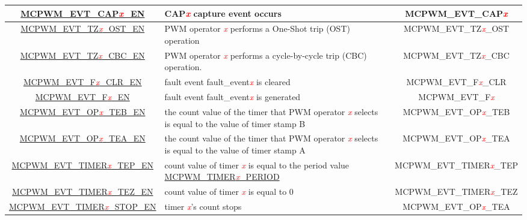 \begin{ThreePartTable}
\begin{longtable}[c]{| c | C{7cm} | c |}
    \hyperref[fielddesc:MCPWMEVTCAP0EN]{MCPWM\_EVT\_CAP\textcolor{red}{\it{x}}\_EN}  
    &  CAP\textcolor{red}{\it{x}} capture event occurs
    &  MCPWM\_EVT\_CAP\textcolor{red}{\it{x}}    \\\hline
    \hyperref[fielddesc:MCPWMEVTTZ0OSTEN]{MCPWM\_EVT\_TZ\textcolor{red}{\it{x}}\_OST\_EN}  
    &  PWM operator \textcolor{red}{\it{x}} performs a One-Shot trip (OST) operation
    &  MCPWM\_EVT\_TZ\textcolor{red}{\it{x}}\_OST    \\\hline
    \hyperref[fielddesc:MCPWMEVTTZ0CBCEN]{MCPWM\_EVT\_TZ\textcolor{red}{\it{x}}\_CBC\_EN}
    & PWM operator \textcolor{red}{\it{x}} performs a cycle-by-cycle trip (CBC) operation.
    & MCPWM\_EVT\_TZ\textcolor{red}{\it{x}}\_CBC    \\\hline
    \hyperref[fielddesc:MCPWMEVTF0CLREN]{MCPWM\_EVT\_F\textcolor{red}{\it{x}}\_CLR\_EN}
    & fault event fault\_event\textcolor{red}{\it{x}} is cleared
    & MCPWM\_EVT\_F\textcolor{red}{\it{x}}\_CLR    \\\hline
    \hyperref[fielddesc:MCPWMEVTF0EN]{MCPWM\_EVT\_F\textcolor{red}{\it{x}}\_EN}
    & fault event fault\_event\textcolor{red}{\it{x}} is generated
    & MCPWM\_EVT\_F\textcolor{red}{\it{x}}    \\\hline
    \hyperref[fielddesc:MCPWMEVTOP0TEBEN]{MCPWM\_EVT\_OP\textcolor{red}{\it{x}}\_TEB\_EN}
    & the count value of the timer that PWM operator \textcolor{red}{\it{x}} selects is equal to the value of timer stamp B
    & MCPWM\_EVT\_OP\textcolor{red}{\it{x}}\_TEB    \\\hline
    \hyperref[fielddesc:MCPWMEVTOP0TEAEN]{MCPWM\_EVT\_OP\textcolor{red}{\it{x}}\_TEA\_EN}
    & the count value of the timer that PWM operator \textcolor{red}{\it{x}} selects is equal to the value of timer stamp A
    & MCPWM\_EVT\_OP\textcolor{red}{\it{x}}\_TEA    \\\hline
    \hyperref[fielddesc:MCPWMEVTTIMER0TEPEN]{MCPWM\_EVT\_TIMER\textcolor{red}{\it{x}}\_TEP\_EN}
    & count value of timer \textcolor{red}{\it{x}} is equal to the period value \hyperref[fielddesc:MCPWMTIMER0PERIOD]{MCPWM\_TIMER\textcolor{red}{\it{x}}\_PERIOD}
    & MCPWM\_EVT\_TIMER\textcolor{red}{\it{x}}\_TEP    \\\hline
    \hyperref[fielddesc:MCPWMEVTTIMER0TEZEN]{MCPWM\_EVT\_TIMER\textcolor{red}{\it{x}}\_TEZ\_EN}
    & count value of timer \textcolor{red}{\it{x}} is equal to 0
    & MCPWM\_EVT\_TIMER\textcolor{red}{\it{x}}\_TEZ    \\\hline
    \hyperref[fielddesc:MCPWMEVTTIMER0STOPEN]{MCPWM\_EVT\_TIMER\textcolor{red}{\it{x}}\_STOP\_EN}
    & timer \textcolor{red}{\it{x}}'s count stops
    & MCPWM\_EVT\_OP\textcolor{red}{\it{x}}\_TEA    \\\hline
\end{longtable}
\end{ThreePartTable}